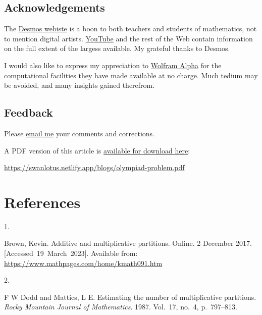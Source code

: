 \documentclass[
  a4paper,
]{article}
\newlength{\cslhangindent}
\newlength{\csllabelwidth}
\newlength{\cslentryspacingunit} %
\newenvironment{CSLReferences}[2] %
 {%
  \setlength{\parindent}{0pt}
  \ifodd #1
  \let\oldpar\par
  \def\par{\hangindent=\cslhangindent\oldpar}
  \fi
  \setlength{\parskip}{#2\cslentryspacingunit}
 }%
 {}
\newcommand{\CSLLeftMargin}[1]{\parbox[t]{\csllabelwidth}{#1}}
\newcommand{\CSLRightInline}[1]{\parbox[t]{\linewidth - \csllabelwidth}{#1}\break}
\begin{document}
\hypertarget{acknowledgements}{%
\subsection{Acknowledgements}\label{acknowledgements}}

The \href{https://www.desmos.com/}{Desmos webiste} is a boon to both
teachers and students of mathematics, not to mention digital artists.
\href{desmos}{YouTube} and the rest of the Web contain information on
the full extent of the largess available. My grateful thanks to Desmos.

I would also like to express my appreciation to
\href{https://www.wolframalpha.com/}{Wolfram Alpha} for the
computational facilities they have made available at no charge. Much
tedium may be avoided, and many insights gained therefrom.

\hypertarget{feedback}{%
\subsection{Feedback}\label{feedback}}

Please \href{mailto:feedback.swanlotus@gmail.com}{email me} your
comments and corrections.

\noindent A PDF version of this article is
\href{./olympiad-problem.pdf}{available for download here}:

\begin{small}

\begin{sffamily}

\url{https://swanlotus.netlify.app/blogs/olympiad-problem.pdf}

\end{sffamily}

\end{small}

\hypertarget{bibliography}{%
\section*{References}\label{bibliography}}

\hypertarget{refs}{}
\begin{CSLReferences}{0}{0}
\leavevmode{}%
\CSLLeftMargin{1. }%
\CSLRightInline{Brown, Kevin. Additive and multiplicative partitions.
Online. 2 December 2017. {[}Accessed~19~March~2023{]}. Available from:
\url{https://www.mathpages.com/home/kmath091.htm}}

\leavevmode{}%
\CSLLeftMargin{2. }%
\CSLRightInline{F W Dodd and Mattics, L E. Estimating the number of
multiplicative partitions. \emph{Rocky Mountain Journal of Mathematics}.
1987. Vol.~17, no.~4, p.~797--813. }

\end{CSLReferences}
\end{document}
